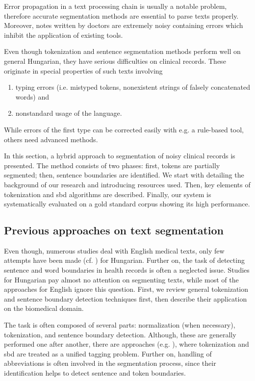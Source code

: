 Error propagation in a text processing chain is usually a notable problem, therefore accurate segmentation methods are essential to parse texts properly.
Moreover, notes written by doctors are extremely noisy containing errors which inhibit the application of existing tools.

Even though tokenization and sentence segmentation methods perform well on general Hungarian, they have serious difficulties on clinical records.
These originate in special properties of such texts involving
\begin{enumerate} %
 \item typing errors (i.e. mistyped tokens, nonexistent strings of falsely concatenated words) and
 \item nonstandard usage of the language.
\end{enumerate}
While errors of the first type can be corrected easily with e.g. a rule-based tool, others need advanced methods. 

In this section, a hybrid approach to segmentation of noisy clinical records is presented. 
The method consists of two phases: first, tokens are partially segmented; then, sentence boundaries are identified.
We start with detailing the background of our research and introducing resources used.
Then, key elements of tokenization and \gls{sbd} algorithms are described. 
Finally, our system is systematically evaluated on a gold standard corpus showing its high performance.

\subsection{Previous approaches on text segmentation}

Even though, numerous studies deal with English medical texts, only few attempts have been made (cf. \cite{Siklosi2012,Siklosi2013,Siklosi2013b}) for Hungarian. 
Further on, the task of detecting sentence and word boundaries in health records is often a neglected issue.
Studies for Hungarian pay almost no attention on segmenting texts, while
most of the approaches for English ignore this question. 
First, we review general tokenization and sentence boundary detection techniques first, then describe their application on the biomedical domain.

The task is often composed of several parts: normalization (when necessary), tokenization, and sentence boundary detection.  
Although, these are generally performed one after another, there are approaches (e.g. \cite{mikheev2000tagging,zhu2007unified}), where tokenization and \acrshort{sbd} are treated as a unified tagging problem. 
Further on, handling of abbreviations is often involved in the segmentation process, since their identification helps to detect sentence and token boundaries.

